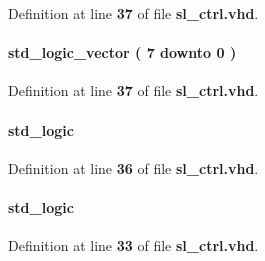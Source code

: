 Definition at line {\bf 37} of file {\bf sl\+\_\+ctrl.\+vhd}.

\paragraph[{delay\+\_\+r}]{ {\bfseries \textcolor{comment}{std\+\_\+logic\+\_\+vector}\textcolor{vhdlchar}{ }\textcolor{vhdlchar}{(}\textcolor{vhdlchar}{ }\textcolor{vhdlchar}{ } \textcolor{vhdldigit}{7} \textcolor{vhdlchar}{ }\textcolor{keywordflow}{downto}\textcolor{vhdlchar}{ }\textcolor{vhdlchar}{ } \textcolor{vhdldigit}{0} \textcolor{vhdlchar}{ }\textcolor{vhdlchar}{)}\textcolor{vhdlchar}{ }} \hspace{0.3cm}{\ttfamily [Signal]}}\label{classsl__ctrl_1_1arch_a20170e57ef90083aa90762a787f6c9f9}


Definition at line {\bf 37} of file {\bf sl\+\_\+ctrl.\+vhd}.

\paragraph[{edge}]{ {\bfseries \textcolor{comment}{std\+\_\+logic}\textcolor{vhdlchar}{ }} \hspace{0.3cm}{\ttfamily [Signal]}}\label{classsl__ctrl_1_1arch_a93e4ec2a91a452e5457e8fdbdf0b9dca}


Definition at line {\bf 36} of file {\bf sl\+\_\+ctrl.\+vhd}.

\paragraph[{f\+\_\+n}]{ {\bfseries \textcolor{comment}{std\+\_\+logic}\textcolor{vhdlchar}{ }} \hspace{0.3cm}{\ttfamily [Signal]}}\label{classsl__ctrl_1_1arch_a0a3ba19031f896ec08135f37c9754be5}


Definition at line {\bf 33} of file {\bf sl\+\_\+ctrl.\+vhd}.

